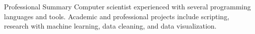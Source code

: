 \begin{rSection}{Professional Summary}
	Computer scientist experienced with several programming languages and tools. Academic and professional projects include scripting, research with machine learning, data cleaning, and data visualization.
\end{rSection}

